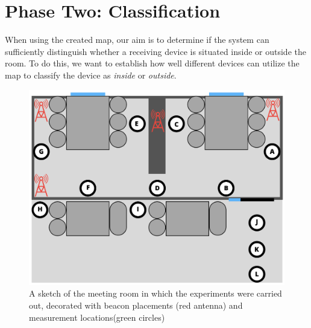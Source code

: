 \section{Phase Two: Classification}\label{sec:eval_phase2} %
When using the created map, our aim is to determine if the system can sufficiently distinguish whether a receiving device is situated inside or outside the room.
To do this, we want to establish how well different devices can utilize the map to classify the device as \textit{inside} or \textit{outside}. 
\begin{figure}[h]
    \centering
    \includegraphics[scale=0.5]{images/experiment_setup.png}
    \caption{A sketch of the meeting room in which the experiments were carried out, decorated with beacon placements (red antenna) and measurement locations(green circles)}
    \label{fig:experiment_setup}
\end{figure}

